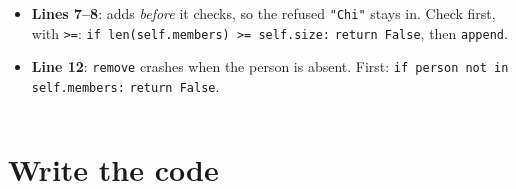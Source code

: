\documentclass[aspectratio=169]{beamer}
\newcommand{\code}[1]{\texttt{#1}}
\begin{document}
\begin{frame}
\begin{columns}[T,onlytextwidth]
\begin{onlyenv}
\begin{itemize}[itemsep=0.25em, leftmargin=1em]
            every team, so \code{blue} sees \code{red}'s members. Delete it; write
            \code{self.members = []} in \code{\_\_init\_\_}.
      \item \textbf{Lines 7--8}: adds \emph{before} it checks, so the refused
            \code{"Chi"} stays in. Check first, with \code{>=}:
            \code{if len(self.members) >= self.size:} \code{return False}, then
            \code{append}.
      \item \textbf{Line 12}: \code{remove} crashes when the person is absent. First:
            \code{if person not in self.members:} \code{return False}.
    \end{itemize}
    \end{onlyenv}
  \end{columns}
\end{frame}

\section{Write the code}
\end{document}

